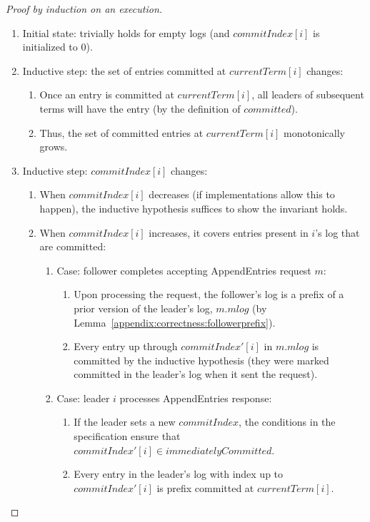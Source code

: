 \begin{proof}[Proof by induction on an execution]\
\begin{enumerate}

\item Initial state: trivially holds for empty logs (and
$commitIndex[i]$ is initialized to 0).

\item Inductive step: the set of entries committed at $currentTerm[i]$
changes:
\begin{enumerate}
\item Once an entry is committed at $currentTerm[i]$, all leaders
of subsequent terms will have the entry (by the definition of $committed$).
\item Thus, the set of committed entries at $currentTerm[i]$
monotonically grows.
\end{enumerate}

\item Inductive step: $commitIndex[i]$ changes:
\begin{enumerate}
\item When $commitIndex[i]$ decreases (if implementations allow this to
happen), the inductive hypothesis suffices
to show the invariant holds.
\item When $commitIndex[i]$ increases, it covers entries present in
$i$'s log that are committed:
\begin{enumerate}
\item Case: follower completes accepting AppendEntries request $m$:
\begin{enumerate}
\item Upon processing the request, the follower's log is a prefix of a
prior version of the leader's log, $m.mlog$ (by
Lemma~\ref{appendix:correctness:followerprefix}).
\item Every entry up through $commitIndex'[i]$ in $m.mlog$ is committed
by the inductive hypothesis (they were marked committed in the leader's
log when it sent the request).
\end{enumerate}
\item Case: leader $i$ processes AppendEntries response:
\begin{enumerate}
\item If the leader sets a new $commitIndex$, the conditions in the
specification
ensure that $commitIndex'[i] \in immediatelyCommitted$.
\item Every entry in the leader's log with index up to $commitIndex'[i]$
is prefix committed at $currentTerm[i]$.
\end{enumerate}
\end{enumerate}
\end{enumerate}


\end{enumerate}
\end{proof}
